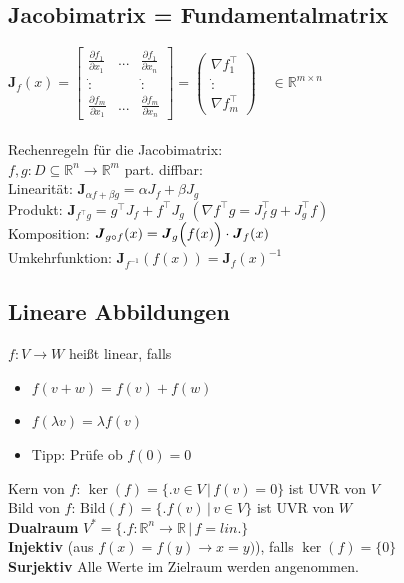 \documentclass[6pt,a4paper]{scrartcl}
\let\olddot = \dot
\newcommand{\iset}[2]{\ensuremath{\bigl\{ \bigl. #1 \, \bigr| \, #2 \bigr\}}}                   %
\newcommand{\eset}[1]{\ensuremath{\bigl\{#1\bigr\}}}                                            %
\newcommand{\ma}[1]{\ensuremath{\boldsymbol {#1}}}                                              %
\newcommand{\svdots}{\ensuremath{\olddot :}}                                                    %
\renewcommand{\emph}[1]{\textbf{#1}}                                                            %
\renewcommand*{\dot}[1]{\accentset{\mbox{\textrm{\large\bfseries .}} }{#1}}                     %
\newcommand{\ra}[0]{\ensuremath{\rightarrow}}                                  %
\begin{document}
\begin{multicols*}{4}
    \subsection{Jacobimatrix = Fundamentalmatrix}
    $\ma J_f (x) = \begin{bmatrix} \frac{\partial f_1}{\partial x_1} & ... & \frac{\partial f_1}{\partial x_n} \\ \svdots & & \svdots \\ \frac{\partial f_m}{\partial x_1} & ... & \frac{\partial f_m}{\partial x_n} \end{bmatrix} = \begin{pmatrix} \nabla f_1^\top \\ \svdots \\ \nabla f_m^\top \end{pmatrix}  \quad \in \mathbb R^{m \times n}$\\ \\
    Rechenregeln für die Jacobimatrix:\\
    $f,g: D \subseteq \mathbb R^n \rightarrow \mathbb R^m$ part. diffbar:\\
    Linearität: $\ma J_{\alpha f + \beta g} = \alpha J_f + \beta J_g$\\
    Produkt: $\ma J_{f^\top g} = g^\top J_f + f^\top J_g$ \quad $(\nabla f^\top g = J_f^\top g + J_g^\top f)$\\
    Komposition: $\ma J_{g \circ f}(x) = \ma J_g\Bigl(f(x)\Bigr) \cdot \ma J_f(x)$\\
    Umkehrfunktion: $\ma J_{f^{-1}} (f(x)) = \ma J_f (x)^{-1}$

    \subsection{Lineare Abbildungen}
    $f:V \rightarrow W$ heißt linear, falls

    \begin{itemize}\itemsep0pt
        \item $f(v+w) = f(v) + f(w)$
        \item $f(\lambda v) = \lambda f(v)$
        \item Tipp: Prüfe ob $f(0) = 0$
    \end{itemize}
    Kern von $f$: $\ker (f) = \iset{v \in V}{f(v) = 0}$ ist UVR von $V$\\
    Bild von $f$: $\mathrm{Bild}(f) = \iset{f(v)}{v \in V}$ ist UVR von $W$\\
    \emph{Dualraum} $V^* = \iset{f:\mathbb R^n \rightarrow \mathbb R}{f=lin.}$\\
    \emph{Injektiv} (aus $f(x) = f(y) \ra x = y)$), falls $\ker(f) = \eset{0}$ \\
    \emph{Surjektiv} Alle Werte im Zielraum werden angenommen.
    \fi


\end{multicols*}
\end{document}
